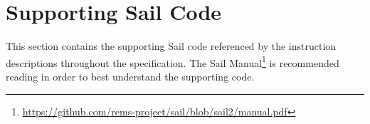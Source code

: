 
\clearpage
\section{Supporting Sail Code}
\label{sec:appx:sail}

This section contains the supporting Sail code referenced by the
instruction descriptions throughout the specification.
The Sail Manual\footnote{\url{https://github.com/rems-project/sail/blob/sail2/manual.pdf}} is recommended reading in order to
best understand the supporting code.



